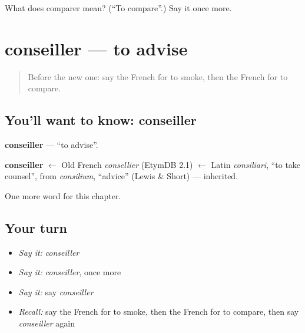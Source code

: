 \begin{tcolorbox}[breakable,colback=teal!4,colframe=teal!35!black,title={Before you move on}]
What does comparer mean? (\textquotedblleft{}To compare\textquotedblright{}.) Say it once more.
\end{tcolorbox}
\section[conseiller]{conseiller — to advise}

\label{lesson:FR-C147-conseiller}



\begin{quote}
Before the new one: say the French for to smoke, then the French for to compare.
\end{quote}

\subsection*{You'll want to know: conseiller}
\textbf{conseiller} — \textquotedblleft{}to advise\textquotedblright{}.

\begin{cousinweb}
\textbf{conseiller} $\leftarrow$ Old French \emph{consellier} (EtymDB 2.1) $\leftarrow$ Latin \emph{consiliari}, \textquotedblleft{}to take counsel\textquotedblright{}, from \emph{consilium}, \textquotedblleft{}advice\textquotedblright{} (Lewis \& Short) — inherited.
\end{cousinweb}

\begin{grammarlens}[title={What you've built}]
One more word for this chapter.
\end{grammarlens}

\subsection*{Your turn}
\begin{itemize}
\raggedright
  \item \emph{Say it:} \emph{conseiller}
  \item \emph{Say it:} \emph{conseiller}, once more
  \item \emph{Say it:} say \emph{conseiller}
  \item \emph{Recall:} say the French for to smoke, then the French for to compare, then say \emph{conseiller} again
\end{itemize}

